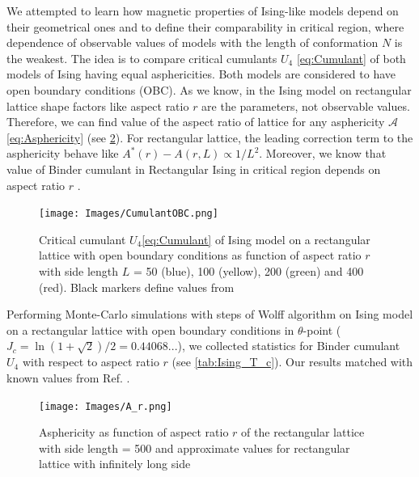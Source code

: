 \documentclass[a4paper]{jpconf}
\begin{document}

We attempted to learn how magnetic properties of Ising-like models depend on their geometrical ones and to define their comparability in critical region, where dependence of observable values of models with the length of conformation $N$ is the weakest. The idea is to compare critical cumulants $U_{4}$ \eqref{eq:Cumulant} of both models of Ising having equal asphericities. Both models are considered to have open boundary conditions (OBC). As we know, in the Ising model on rectangular lattice shape factors like aspect ratio $r$ are the parameters, not observable values. Therefore, we can find value of the aspect ratio of lattice for any asphericity $\mathcal{A}$ \eqref{eq:Asphericity} (see \cref{fig:A_r}). For rectangular lattice, the leading correction term to the asphericity behave like $A^{*}(r) - A(r, L) \propto 1 / L^{2}$. Moreover, we know that value of Binder cumulant in Rectangular Ising in critical region depends on aspect ratio $r$ \cite{Selke2006}. 

\begin{figure}[h]
    \centering
    \texttt{[image: Images/CumulantOBC.png]}
    \caption{Critical cumulant $U_{4}$\eqref{eq:Cumulant} of Ising model on a rectangular lattice with open boundary conditions as function of aspect ratio $r$ with side length $L$ = 50 (blue), 100 (yellow), 200 (green) and 400 (red). Black markers define values from \cite{Selke2006}}
    \label{fig:A_r}
\end{figure}

Performing Monte-Carlo simulations with steps of Wolff algorithm \cite{Newmanb1999} on Ising model on a rectangular lattice with open boundary conditions in $\theta$-point ($J_{c} = \ln{(1 + \sqrt{2}) / 2} =  0.44068... $), we collected statistics for Binder cumulant $U_{4}$ with respect to aspect ratio $r$ (see \cref{tab:Ising_T_c}). Our results matched with known values from Ref. \cite{Selke2006}.

\begin{figure}[h]
    \centering
    \texttt{[image: Images/A\_r.png]}
    \caption{Asphericity as function of aspect ratio $r$ of the rectangular lattice with side length = 500 and approximate values for rectangular lattice with infinitely long side}
    \label{fig:A_r}
\end{figure}
\end{document}

